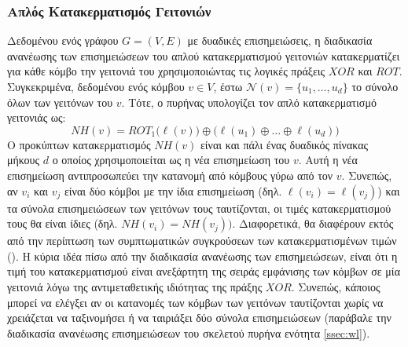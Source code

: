\subsubsection{Απλός Κατακερματισμός Γειτονιών}
Δεδομένου ενός γράφου $G=(V,E)$ με δυαδικές επισημειώσεις, η διαδικασία ανανέωσης των επισημειώσεων του απλού κατακερματισμού γειτονιών κατακερματίζει για κάθε κόμβο την γειτονιά του χρησιμοποιώντας τις λογικές πράξεις $XOR$ και $ROT$.
Συγκεκριμένα, δεδομένου ενός κόμβου $v \in V$, έστω $\mathcal{N}(v)=\{ u_1,\ldots,u_d \}$ το σύνολο όλων των γειτόνων του $v$.
Τότε, ο πυρήνας υπολογίζει τον απλό κατακερματισμό γειτονιάς ως:
\begin{equation}
    NH(v) = ROT_1 \big( \ell(v) \big) \oplus \big( \ell(u_1) \oplus \ldots \oplus \ell(u_d) \big)
\end{equation}
Ο προκύπτων κατακερματισμός $NH(v)$ είναι και πάλι ένας δυαδικός πίνακας μήκους $d$ ο οποίος χρησιμοποιείται ως η νέα επισημείωση του $v$.
Αυτή η νέα επισημείωση αντιπροσωπεύει την κατανομή από κόμβους γύρω από τον $v$.
Συνεπώς, αν $v_i$ και $v_j$ είναι δύο κόμβοι με την ίδια επισημείωση (δηλ. $\ell(v_i) = \ell(v_j)$) και τα σύνολα επισημειώσεων των γειτόνων τους ταυτίζονται, οι τιμές κατακερματισμού τους θα είναι ίδιες (δηλ. $NH(v_i) = NH(v_j))$.
Διαφορετικά, θα διαφέρουν εκτός από την περίπτωση των συμπτωματικών συγκρούσεων των κατακερματισμένων τιμών ().
Η κύρια ιδέα πίσω από την διαδικασία ανανέωσης των επισημειώσεων, είναι ότι η τιμή του κατακερματισμού είναι ανεξάρτητη της σειράς εμφάνισης των κόμβων σε μία γειτονιά λόγω της αντιμεταθετικής ιδιότητας της πράξης $XOR$.
Συνεπώς, κάποιος μπορεί να ελέγξει αν οι κατανομές των κόμβων των γειτόνων ταυτίζονται χωρίς να χρειάζεται να ταξινομήσει ή να ταιριάξει δύο σύνολα επισημειώσεων (παράβαλε την διαδικασία ανανέωσης επισημειώσεων του σκελετού πυρήνα  ενότητα \ref{ssec:wl}).

